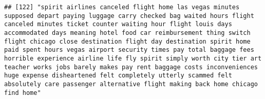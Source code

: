 \documentclass[
]{article}
\begin{document}
\begin{verbatim}
## [122] "spirit airlines canceled flight home las vegas minutes supposed depart paying luggage carry checked bag waited hours flight canceled minutes ticket counter waiting hour flight louis days accommodated days meaning hotel food car reimbursement thing switch flight chicago close destination flight day destination spirit home paid spent hours vegas airport security times pay total baggage fees horrible experience airline life fly spirit simply worth city tier art teacher works jobs barely makes pay rent baggage costs inconveniences huge expense disheartened felt completely utterly scammed felt absolutely care passenger alternative flight making back home chicago find home"                                                                                                                                                                                                                                                                                                                                                                                                                                                                                                                                                                                                                                                                                                                                                                                                                                                                                                                                                                                                                                                                                           

\end{verbatim}
\end{document}

